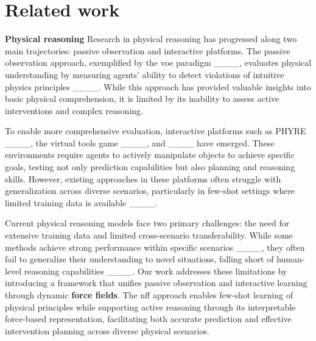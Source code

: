 \section{Related work}
\textbf{Physical reasoning\quad{}}
Research in physical reasoning has progressed along two main trajectories: passive observation and interactive platforms. The passive observation approach, exemplified by the \ac{voe} paradigm ____, evaluates physical understanding by measuring agents' ability to detect violations of intuitive physics principles ____. While this approach has provided valuable insights into basic physical comprehension, it is limited by its inability to assess active interventions and complex reasoning.

To enable more comprehensive evaluation, interactive platforms such as PHYRE ____, the virtual tools game ____, and \benchmark ____ have emerged. These environments require agents to actively manipulate objects to achieve specific goals, testing not only prediction capabilities but also planning and reasoning skills. However, existing approaches in these platforms often struggle with generalization across diverse scenarios, particularly in few-shot settings where limited training data is available ____.

Current physical reasoning models face two primary challenges: the need for extensive training data and limited cross-scenario transferability. While some methods achieve strong performance within specific scenarios ____, they often fail to generalize their understanding to novel situations, falling short of human-level reasoning capabilities ____. Our work addresses these limitations by introducing a framework that unifies passive observation and interactive learning through dynamic \textbf{force fields}. The \ac{nff} approach enables few-shot learning of physical principles while supporting active reasoning through its interpretable force-based representation, facilitating both accurate prediction and effective intervention planning across diverse physical scenarios.


